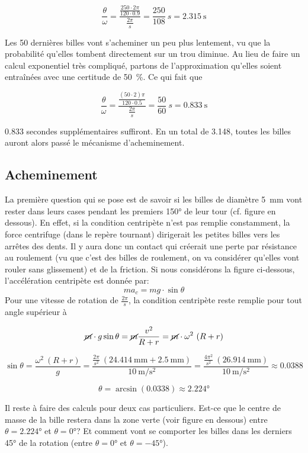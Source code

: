 \[\frac{\theta}{\omega} = \frac{\frac{250 \cdot 2\pi}{120 \cdot 0.9}}{\frac{2\pi}{s}} = \frac{250}{108} \ s = \SI{2.315}{\s}\]

Les \num{50} dernières billes vont s'acheminer un peu plus lentement, vu que la probabilité qu'elles tombent directement sur un trou diminue. Au lieu de faire un calcul exponentiel très compliqué, partons de l'approximation qu'elles soient entraînées avec une certitude de \SI{50}{\percent}. Ce qui fait que

\[\frac{\theta}{\omega} = \frac{\frac{(50 \cdot 2)\pi}{120 \cdot 0.5}}{\frac{2 \pi}{s}} = \frac{50}{60} \ s = \SI{0.833}{\s}\]

0.833 secondes supplémentaires suffiront.
En un total de \SI{3.148}{\sec}, toutes les billes auront alors passé le mécanisme d'acheminement.


\subsection{Acheminement}
La première question qui se pose est de savoir si les billes de diamètre \SI{5}{\mm} vont rester dans leurs cases pendant les premiers \ang{150} de leur tour (cf. figure en dessous). En effet, si la condition centripète n'est pas remplie constamment, la force centrifuge (dans le repère tournant) dirigerait les petites billes vers les arrêtes des dents. Il y aura donc un contact qui créerait une perte par résistance au roulement (vu que c'est des billes de roulement, on va considérer qu'elles vont rouler sans glissement) et de la friction. Si nous considérons la figure ci-dessous, l'accélération centripète est donnée par:
\[ma_{c} = mg \cdot \sin{\theta}\]
Pour une vitesse de rotation de \(\frac{2 \pi}{s}\), la condition centripète reste remplie pour tout angle supérieur à 

\[\cancel{m} \cdot g \sin{\theta} = \cancel{m} \frac{v^{2}}{R + r} = \cancel{m} \cdot \omega^{2} \ (R +r)\]

\[\sin{\theta} = \frac{\omega^{2} \ (R + r)}{g} = \frac{\frac{2 \pi}{s^{2}}\ (\SI{24.414}{\milli\metre} + \SI{2.5}{\milli\metre})}{\SI{10}{\m\per\s\squared}} = \frac{\frac{4 \pi^{2}}{s^{2}} \ (\SI{26.914}{\milli\metre})}{\SI{10}{\m\per\s\squared}} \approx 0.0388\]

\[\theta = \arcsin(0.0338) \approx \ang{2.224}\]

Il reste à faire des calculs pour deux cas particuliers. Est-ce que le centre de masse de la bille restera dans la zone verte (voir figure en dessous) entre \(\theta = \ang{2.224}\) et \(\theta = \ang{0}\)? Et comment vont se comporter les billes dans les derniers \ang{45} de la rotation (entre \(\theta = \ang{0}\) et \(\theta = \ang{-45}\)).
